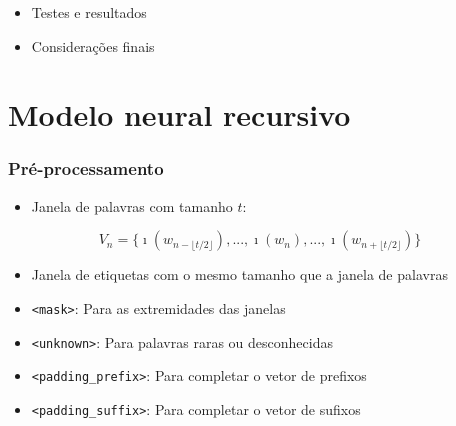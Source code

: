 \documentclass[10pt]{beamer}
\begin{document}
\begin{frame}
\begin{itemize}
    \item[\color{gray}{$\bullet$}] Testes e resultados

    \item[\color{gray}{$\bullet$}] Considerações finais

  \end{itemize}

\end{frame}


\section{Modelo neural recursivo}


\begin{frame}[fragile]
\frametitle{Pré-processamento}


  \begin{itemize}
    \item Janela de palavras com tamanho $t$:
  \end{itemize}

  \begin{equation} \nonumber
    V_n = \big\{ \imath(w_{n - \lfloor t/2 \rfloor}), ..., \imath(w_n), ..., \imath(w_{n + \lfloor t/2 \rfloor}) \big\}
  \end{equation}

  \begin{itemize}
    \item Janela de etiquetas com o mesmo tamanho que a janela de palavras
  \end{itemize}

  \begin{itemize}
    \item \texttt{<mask>}: Para as extremidades das janelas
    \item \texttt{<unknown>}: Para palavras raras ou desconhecidas
    \item \texttt{<padding\_prefix>}: Para completar o vetor de prefixos
    \item \texttt{<padding\_suffix>}: Para completar o vetor de sufixos
  \end{itemize}

\end{frame}
\end{document}
